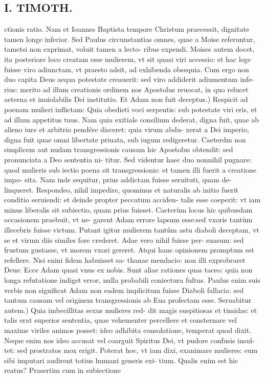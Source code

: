\documentclass{article}
\begin{document}
\begin{pages}
\section*{I. TIMOTH. }
\marginpar{[ p.28 ]}\pstart ctionis ratio. Nam et Ioannes Baptista tempore Christum praecessit, dignitate tamen longe inferior. Sed Paulus circunstantias omnes, quae a Moise referuntur, tametsi non exprimat, voluit tamen a lecto- ribus expendi. Moises autem docet, ita posteriore loco creatam esse mulierem, vt sit quasi viri accessio: et hac lege fuisse viro adiunctam, vt praesto adsit, ad exhibenda obsequia. Cum ergo non duo capita Deus aequa potestate creauerit: sed viro addiderit adiumentum infe- rius: merito ad illum creationis ordinem nos Apostolus reuocat, in quo relucet aeterna et inuiolabilis Dei institutio.  \pend\pstart Et Adam non fuit deceptus.) Respicit ad poenam mulieri inflictam: Quia obedisti voci serpentis: sub potestate viri eris, et ad illum appetitus tuus. Nam quia exitiale consilium dederat, digna fuit, quae ab alieno iure et arbitrio pendêre disceret: quia virum abdu- xerat a Dei imperio, digna fuit quae omni libertate priuata, sub iugum redigeretur. Caeterdm non simplicem aut nudam transgressionis causam hic Apostolus obtendit: sed pronunciata a Deo sententia ni- titur. Sed videntur haec duo nonnihil pugnare: quod mulieris sub iectio poena sit transgressionis: et tamen illi fuerit a creatione impo- sita. Nam inde sequitur, prius addictam fuisse seruituti, quam de- linqueret. Respondeo, nihil impedire, quominus et naturalis ab initio fuerit conditio seruiendi: et deinde propter peccatum acciden- talis esse coeperit: vt iam minus liberalis sit subiectio, quam prius fuisset. Caeterùm locus hic quibusdam occasionem praebuit, vt ne- garent Adam errore lapsum esse:sed vxoris tantùm illecebris fuisse victum. Putant igitur mulierem tantûm astu diaboli deceptam, vt se et virum diis similes fore crederet. Adae vero nihil fuisse per- suasum: sed frustum gustasse, vt morem vxori gereret. Atqui hanc opinionem promptum est refellere. Nisi enini fidem habuisset sa- thanae mendacio: non illi exprobraret Deus: Ecce Adam quasi vnus ex nobis. Sunt aliae rationes quas taceo: quia non longa refutatione indiget error, nulla probabili coniectura fultus. Paulus enim suis verbis non significat Adam non eadem implicitum fuisse Diaboli fallacia: sed tantum causam vel originem transgressionis ab Eua profectam esse.  \pend\pstart Seruabitur autem.) Quia imbecillitas sexus mulieres red- dit magis suspitiosas et timidas: et talis erat superior sententia, quae vehementer percellere et consternare vel maxime viriles animos posset: ideo adhibita consolatione, temperat quod dixit. Neque enim nos ideo accusat vel coarguit Spiritus Dei, vt pudore confusis insul- tet: sed prostratos mox erigit. Poterat hoc, vt iam dixi, exanimare mulieres: eum sibi imputari audirent totius humani generis exi- tium. Qualis enim est hic reatus? Prasertim cum in subiectione  \pend

\end{pages}
\end{document}
